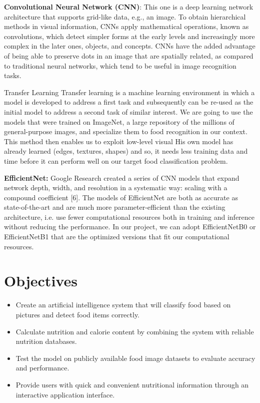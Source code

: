 \documentclass[12pt, openany]{report}
\begin{document}
{\textbf{Convolutional Neural Network (CNN)}}: This one is a deep learning network architecture that supports grid-like data, e.g., an image. To obtain hierarchical methods in visual information, CNNs apply mathematical operations, known as convolutions, which detect simpler forms at the early levels and increasingly more complex in the later ones, objects, and concepts. CNNs have the added advantage of being able to preserve dots in an image that are spatially related, as compared to traditional neural networks, which tend to be useful in image recognition tasks.

Transfer Learning Transfer learning is a machine learning environment in which a model is developed to address a first task and subsequently can be re-used as the initial model to address a second task of similar interest. We are going to use the models that were trained on ImageNet, a large repository of the millions of general-purpose images, and specialize them to food recognition in our context. This method then enables us to exploit low-level visual His own model has already learned (edges, textures, shapes) and so, it needs less training data and time before it can perform well on our target food classification problem.

{\textbf{EfficientNet:}} Google Research created a series of CNN models that expand network depth, width, and resolution in a systematic way: scaling with a compound coefficient [6]. The models of EfficientNet are both as accurate as state-of-the-art and are much more parameter-efficient than the existing architecture, i.e. use fewer computational resources both in training and inference without reducing the performance. In our project, we can adopt EfficientNetB0 or EfficientNetB1 that are the optimized versions that fit our computational resources.





\section{Objectives}
\begin{itemize}
    \item Create an artificial intelligence system that will classify food based on pictures and detect food items correctly.
    \item Calculate nutrition and calorie content by combining the system with reliable nutrition databases.
    \item Test the model on publicly available food image datasets to evaluate accuracy and performance.
    \item Provide users with quick and convenient nutritional information through an interactive application interface.
\end{itemize}
\end{document}
